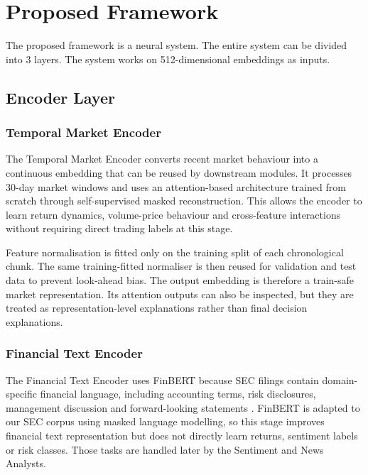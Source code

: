 \documentclass[conference]{IEEEtran}
\begin{document}
\section{Proposed Framework}
The proposed framework is a neural system. The entire system can be divided into 3 layers. The system works on 512-dimensional embeddings as inputs. %

\subsection{Encoder Layer}

\subsubsection{Temporal Market Encoder}
The Temporal Market Encoder converts recent market behaviour into a continuous embedding that can be reused by downstream modules. It processes 30-day market windows and uses an attention-based architecture trained from scratch through self-supervised masked reconstruction. This allows the encoder to learn return dynamics, volume-price behaviour and cross-feature interactions without requiring direct trading labels at this stage.

Feature normalisation is fitted only on the training split of each chronological chunk. The same training-fitted normaliser is then reused for validation and test data to prevent look-ahead bias. The output embedding is therefore a train-safe market representation. Its attention outputs can also be inspected, but they are treated as representation-level explanations rather than final decision explanations.

\subsubsection{Financial Text Encoder}
The Financial Text Encoder uses FinBERT because SEC filings contain domain-specific financial language, including accounting terms, risk disclosures, management discussion and forward-looking statements \cite{FinBERT}. FinBERT is adapted to our SEC corpus using masked language modelling, so this stage improves financial text representation but does not directly learn returns, sentiment labels or risk classes. Those tasks are handled later by the Sentiment and News Analysts.
\end{document}
